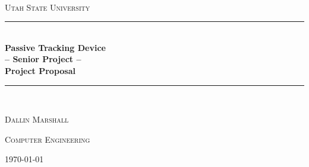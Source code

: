 \documentclass[11pt]{article}
\begin{document}
\newcommand{\HRule}{\rule{\linewidth}{0.5mm}}

\begin{titlepage}
\begin{center}

~\\[4cm]

\textsc{\Large \textsc{Utah State University} }\\[0.5cm]

\HRule \\[0.4cm]
{ \huge \bfseries Passive Tracking Device \\ -- Senior Project -- \\ Project Proposal \\[0.4cm] }

\HRule \\[1.5cm]

\noindent
\begin{minipage}{0.4\textwidth}
\begin{flushleft} \large
\textsc{ Dallin Marshall }
\end{flushleft}
\end{minipage}%
\begin{minipage}{0.4\textwidth}
\begin{flushright} \large
\textsc{ Computer Engineering }
\end{flushright}
\end{minipage}

\vfill

{\large \today}

\end{center}
\end{titlepage}
\end{document}
